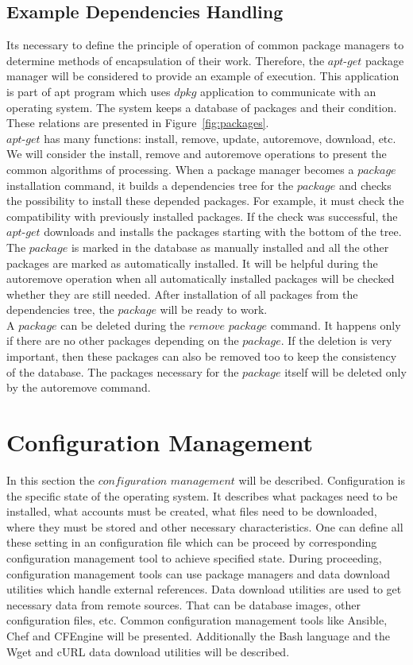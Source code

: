 \subsection*{Example Dependencies Handling}\label{subs:depapt}
Its necessary to define the principle of operation of common package managers to determine methods of encapsulation of their work.
Therefore, the $apt$-$get$ package manager will be considered to provide an example of execution.
This application is part of \gls{apt} program which uses $dpkg$ application to communicate with an operating system.
The system keeps a database of packages and their condition.
These relations are presented in Figure~\ref{fig:packages}.\\
$apt$-$get$ has many functions: install, remove, update, autoremove, download, etc.
We will consider the install, remove and autoremove operations to present the common algorithms of processing.
When a package manager becomes a $package$ installation command, it builds a dependencies tree for the $package$ and checks the possibility to install these depended packages.
For example, it must check the compatibility with previously installed packages. 
If the check was successful, the $apt$-$get$ downloads and installs the packages starting with the bottom of the tree.
The $package$ is marked in the database as manually installed and all the other packages are marked as automatically installed. 
It will be helpful during the autoremove operation when all automatically installed packages will be checked whether they are still needed.
After installation of all packages from the dependencies tree, the $package$ will be ready to work.\\
A $package$ can be deleted during the $remove$ $package$ command.
It happens only if there are no other packages depending on the $package$. 
If the deletion is very important, then these packages can also be removed too to keep the consistency of the database. 
The packages necessary for the $package$ itself will be deleted only by the autoremove command.

\section{Configuration Management}\label{sec:confman}
In this section the $configuration$ $management$ will be described. 
Configuration is the specific state of the operating system.
It describes what packages need to be installed, what accounts must be created, what files need to be downloaded, where they must be stored and other necessary characteristics.
One can define all these setting in an configuration file which can be proceed by corresponding configuration management tool to achieve specified state.
During proceeding, configuration management tools can use package managers and data download utilities which handle external references.
Data download utilities are used to get necessary data from remote sources.
That can be database images, other configuration files, etc.
Common configuration management tools like Ansible, Chef and CFEngine will be presented.
Additionally the Bash language and the Wget and cURL data download utilities will be described. 

